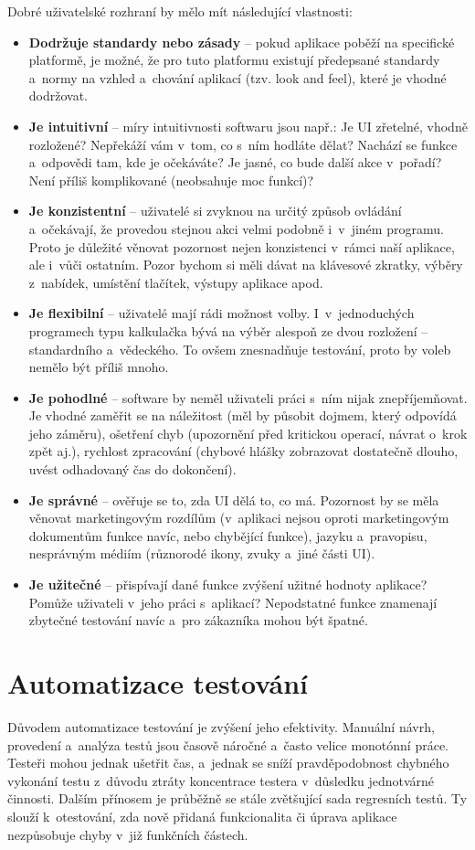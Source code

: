 		Dobré uživatelské rozhraní by mělo mít následující vlastnosti:
			\begin{itemize}
				\item \textbf{Dodržuje standardy nebo zásady} -- pokud aplikace poběží na specifické platformě, je možné, že pro tuto platformu existují předepsané standardy a~normy na vzhled a~chování aplikací (tzv. look and feel), které je vhodné dodržovat.
				\item \textbf{Je intuitivní} -- míry intuitivnosti softwaru jsou např.: Je UI zřetelné, vhodně rozložené? Nepřekáží vám v~tom, co s~ním hodláte dělat? Nachází se funkce a~odpovědi tam, kde je očekáváte? Je jasné, co bude další akce v~pořadí? Není příliš komplikované (neobsahuje moc funkcí)?
				\item \textbf{Je konzistentní} -- uživatelé si zvyknou na určitý způsob ovládání a~očekávají, že provedou stejnou akci velmi podobně i~v~jiném programu. Proto je důležité věnovat pozornost nejen konzistenci v~rámci naší aplikace, ale i~vůči ostatním. Pozor bychom si měli dávat na klávesové zkratky, výběry z~nabídek, umístění tlačítek, výstupy aplikace apod.
				\item \textbf{Je flexibilní} -- uživatelé mají rádi možnost volby. I~v~jednoduchých programech typu kalkulačka bývá na výběr alespoň ze dvou rozložení -- standardního a~vědeckého. To ovšem znesnadňuje testování, proto by voleb nemělo být příliš mnoho.
				\item \textbf{Je pohodlné} -- software by neměl uživateli práci s~ním nijak znepříjemňovat. Je vhodné zaměřit se na náležitost (měl by působit dojmem, který odpovídá jeho záměru), ošetření chyb (upozornění před kritickou operací, návrat o~krok zpět aj.), rychlost zpracování (chybové hlášky zobrazovat dostatečně dlouho, uvést odhadovaný čas do dokončení).
				\item \textbf{Je správné} -- ověřuje se to, zda UI dělá to, co má. Pozornost by se měla věnovat marketingovým rozdílům (v~aplikaci nejsou oproti marketingovým dokumentům funkce navíc, nebo chybějící funkce), jazyku a~pravopisu, nesprávným médiím (různorodé ikony, zvuky a~jiné části UI).
				\item \textbf{Je užitečné} -- přispívají dané funkce zvýšení užitné hodnoty aplikace? Pomůže uživateli v~jeho práci s~aplikací? Nepodstatné funkce znamenají zbytečné testování navíc a~pro zákazníka mohou být špatné.
			\end{itemize}
		
		\section{Automatizace testování}
		Důvodem automatizace testování je zvýšení jeho efektivity. Manuální návrh, provedení a~analýza testů jsou časově náročné a~často velice monotónní práce. Testeři mohou jednak ušetřit čas, a~jednak se sníží pravděpodobnost chybného vykonání testu z~důvodu ztráty koncentrace testera v~důsledku jednotvárné činnosti. Dalším přínosem je průběžně se stále zvětšující sada regresních testů. Ty slouží k~otestování, zda nově přidaná funkcionalita či úprava aplikace nezpůsobuje chyby v~již funkčních částech.
		
